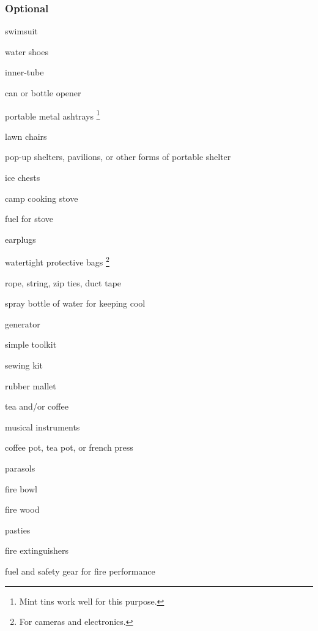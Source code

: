 \begin{multicols}{2}
% 
% 

\end{multicols}

\subsubsection*{Optional}

\begin{multicols}{2}

\begin{checklist}
    \item swimsuit
    \item water shoes
    \item inner-tube
    \item can or bottle opener
    \item portable metal ashtrays \footnote{Mint tins work well for this purpose.}
    \item lawn chairs
    \item pop-up shelters, pavilions, or other forms of portable shelter
    \item ice chests
    \item camp cooking stove
    \item fuel for stove 
    \item earplugs
    \item watertight protective bags \footnote{For cameras and electronics.}
    \item rope, string, zip ties, duct tape
	\item spray bottle of water for keeping cool
    \item generator
    \item simple toolkit
    \item sewing kit
    \item rubber mallet
    \item tea and/or coffee
    \item musical instruments
    \item coffee pot, tea pot, or french press
    \item parasols
    \item fire bowl
    \item fire wood
    \item pasties
    \item fire extinguishers
    \item fuel and safety gear for fire performance 
\end{checklist}

\end{multicols}


